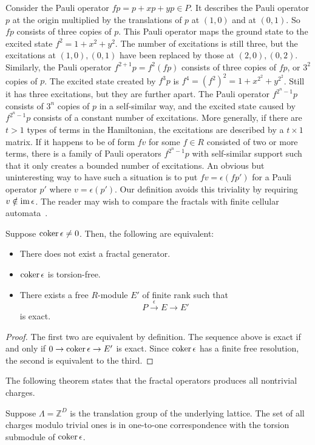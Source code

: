Consider the Pauli operator $fp = p + x p + y p \in P$. 
It describes the Pauli operator $p$ at the origin 
multiplied by the translations of $p$ at $(1,0)$ and at $(0,1)$.
So $fp$ consists of three copies of $p$.
This Pauli operator maps the ground state to the excited state $f^2 = 1 + x^2 + y^2$.
The number of excitations is still three, but the excitations at $(1,0), (0,1)$ 
have been replaced by those at $(2,0),(0,2)$.
Similarly, the Pauli operator $f^{2+1} p = f^2 (fp)$ 
consists of three copies of $fp$, or $3^2$ copies of $p$.
The excited state created by $f^3 p$ is $f^4 = (f^2)^2 = 1 + x^{2^2} + y^{2^2}$.
Still it has three excitations, but they are further apart.
The Pauli operator $f^{2^n -1} p$ consists of $3^n$ copies of $p$ in a self-similar way,
and the excited state caused by $f^{2^n -1} p$ consists of a constant number of excitations.
%
More generally, if there are $t > 1$ types of terms in the Hamiltonian,
the excitations are described by a $t \times 1$ matrix.
If it happens to be of form $f v$ for some $f \in R$ consisted of two or more terms,
there is a family of Pauli operators $f^{2^n -1} p$ with self-similar support
such that it only creates a bounded number of excitations.
An obvious but uninteresting way to have such a situation is to put
$f v = \epsilon (f p')$ for a Pauli operator $p'$ where $v = \epsilon( p' )$.
Our definition avoids this triviality by requiring $v \notin \mathop{\mathrm{im}}\nolimits \epsilon$.
The reader may wish to compare the fractals with finite cellular automata~\cite{MartinOdlyzkoAndrewWolfram1984}.

\begin{prop}
\cite[16.33]{BrunsVetter}
Suppose $\mathop{\mathrm{coker}}\nolimits \epsilon \ne 0$.
Then, the following are equivalent:
\begin{itemize}
 \item There does not exist a fractal generator.
 \item $\mathop{\mathrm{coker}}\nolimits \epsilon$ is torsion-free.
 \item There exists a free $R$-module $E'$ of finite rank such that
\[
 P \xrightarrow{\epsilon} E \to E'
\]
is exact.
\label{prop:nofractal-torsionless}
\end{itemize}
\end{prop}
\begin{proof}
The first two are equivalent by definition.
The sequence above is exact if and only if
$ 0 \to \mathop{\mathrm{coker}}\nolimits{\epsilon} \to E' $
is exact.
Since $\mathop{\mathrm{coker}}\nolimits \epsilon$ has a finite free resolution,
the second is equivalent to the third.
\end{proof}
The following theorem states that the fractal operators produces all nontrivial charges.
\begin{theorem}
Suppose $\Lambda = \mathbb{Z}^D$ is the translation group of the underlying lattice.
The set of all charges modulo trivial ones is in one-to-one correspondence
with the torsion submodule of $\mathop{\mathrm{coker}}\nolimits \epsilon$.
\label{thm:charge-equals-torsion}
\end{theorem}

